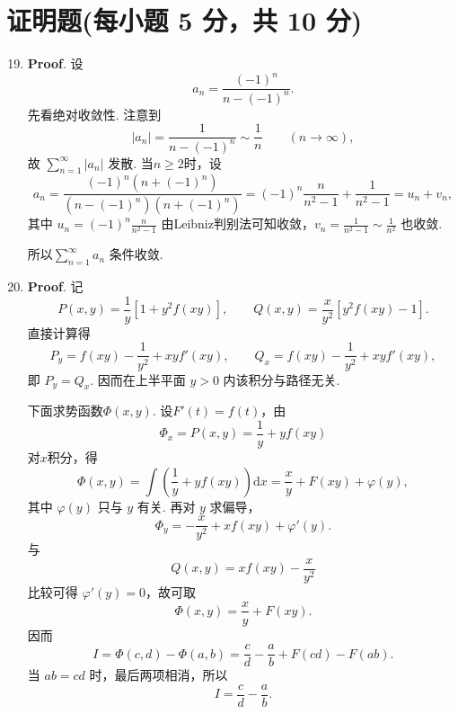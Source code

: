 \documentclass[../main.tex]{subfiles}
\begin{document}
\section{证明题(每小题 5 分，共 10 分)}
\begin{enumerate}
    \setcounter{enumi}{18}
    \item \textbf{Proof}. 设
          \[
              a_n=\frac{(-1)^n}{n-(-1)^n}.
          \]
          先看绝对收敛性. 注意到
          \[
              |a_n|=\frac{1}{n-(-1)^n}\sim \frac{1}{n}\qquad (n\to\infty),
          \]
          故 \(\sum_{n=1}^{\infty} |a_n|\) 发散. 当$n\geq2$时，设
          \[
              a_n=\frac{(-1)^n\left(n+(-1)^n\right)}{\left(n-(-1)^n\right)\left(n+(-1)^n\right)}=(-1)^n\frac{n}{n^2-1}+\frac{1}{n^2-1}=u_n+v_n,
          \]
          其中 $u_n=(-1)^n\frac{n}{n^2-1}$ 由Leibniz判别法可知收敛，$v_n=\frac{1}{n^2-1}\sim \frac{1}{n^2}$ 也收敛.

          所以$\sum_{n=1}^{\infty} a_n$ 条件收敛.

    \item \textbf{Proof}. 记
          \[
              P(x,y)=\frac{1}{y}[1+y^2f(xy)],\qquad
              Q(x,y)=\frac{x}{y^2}[y^2f(xy)-1].
          \]
          直接计算得
          \[
              P_y=f(xy)-\frac{1}{y^2}+xyf'(xy),\qquad
              Q_x=f(xy)-\frac{1}{y^2}+xyf'(xy),
          \]
          即 \(P_y=Q_x\). 因而在上半平面 \(y>0\) 内该积分与路径无关.

          下面求势函数$\Phi(x,y)$. 设$F'(t)=f(t)$，由
          \[
              \Phi_x=P(x,y)=\frac{1}{y}+yf(xy)
          \]
          对$x$积分，得
          \[
              \Phi(x,y)=\int\left(\frac{1}{y}+yf(xy)\right)\mathrm{d}x
              =\frac{x}{y}+F(xy)+\varphi(y),
          \]
          其中 \(\varphi(y)\) 只与 \(y\) 有关. 再对 \(y\) 求偏导，
          \[
              \Phi_y=-\frac{x}{y^2}+xf(xy)+\varphi'(y).
          \]
          与
          \[
              Q(x,y)=xf(xy)-\frac{x}{y^2}
          \]
          比较可得 \(\varphi'(y)=0\)，故可取
          \[
              \Phi(x,y)=\frac{x}{y}+F(xy).
          \]
          因而
          \[
              I=\Phi(c,d)-\Phi(a,b)=\frac{c}{d}-\frac{a}{b}+F(cd)-F(ab).
          \]
          当 \(ab=cd\) 时，最后两项相消，所以
          \[
              I=\frac{c}{d}-\frac{a}{b}.
          \]

\end{enumerate}
\end{document}
